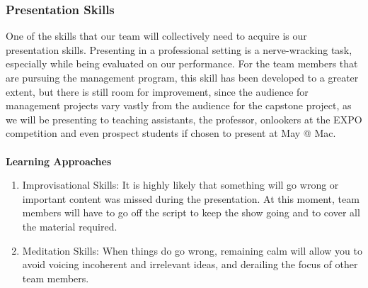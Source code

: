 \documentclass[12pt,letterpaper]{article}
\begin{document}
\subsubsection{Presentation Skills}
One of the skills that our team will collectively need to acquire is our
presentation skills. Presenting in a professional setting is a nerve-wracking
task, especially while being evaluated on our performance. For the team members
that are pursuing the management program, this skill has been developed to a
greater extent, but there is still room for improvement, since the audience for
management projects vary vastly from the audience for the capstone project, as
we will be presenting to teaching assistants, the professor, onlookers at the
EXPO competition and even prospect students if chosen to present at May @ Mac.
\\
\\
\noindent \textbf{Learning Approaches}
\begin{enumerate}
    \item Improvisational Skills: It is highly likely that something will go
    wrong or important content was missed during the presentation. At this
    moment, team members will have to go off the script to keep the show going
    and to cover all the material required. 
    \item Meditation Skills: When things do go wrong, remaining calm will allow
    you to avoid voicing incoherent and irrelevant ideas, and derailing the
    focus of other team members.
\end{enumerate}
\end{document}
